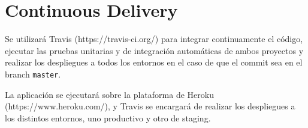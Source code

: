 \documentclass[a4paper,11pt]{article}
\begin{document}
\section{Continuous Delivery}

Se utilizará Travis (https://travis-ci.org/) para integrar continuamente el
código, ejecutar las pruebas unitarias y de integración automáticas de ambos
proyectos y realizar los despliegues a todos los entornos en el caso de que el
commit sea en el branch \texttt{master}.

La aplicación se ejecutará sobre la plataforma de Heroku
(https://www.heroku.com/), y Travis se encargará de realizar los despliegues a
los distintos entornos, uno productivo y otro de staging.
\end{document}
